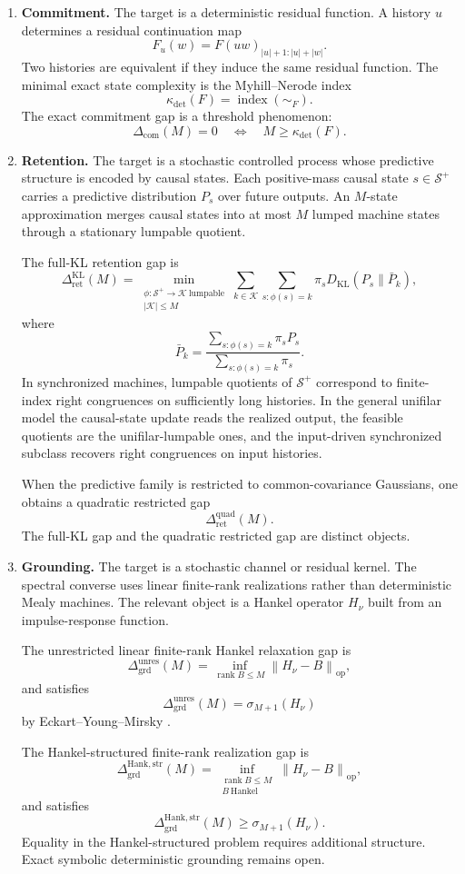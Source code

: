 \documentclass[12pt]{article}
\theoremstyle{definition}
\newcommand{\norm}[1]{\left\lVert#1\right\rVert}
\newcommand{\RetKL}{\Delta_{\mathrm{ret}}^{\mathrm{KL}}}
\newcommand{\RetQuad}{\Delta_{\mathrm{ret}}^{\mathrm{quad}}}
\newcommand{\Dunres}{\Delta_{\mathrm{grd}}^{\mathrm{unres}}}
\newcommand{\DHankstr}{\Delta_{\mathrm{grd}}^{\mathrm{Hank,str}}}
\newcommand{\Com}{\Delta_{\mathrm{com}}}
\newcommand{\Splus}{\mathcal S^{+}}
\begin{document}
\begin{enumerate}[label=(\arabic*),leftmargin=2.2em]
\item \textbf{Commitment.}
The target is a deterministic residual function.  A history $u$ determines a
residual continuation map
\[
F_u(w)=F(uw)_{|u|+1:|u|+|w|}.
\]
Two histories are equivalent if they induce the same residual function.  The
minimal exact state complexity is the Myhill--Nerode index
\[
\kappa_{\det}(F)
=
\operatorname{index}(\sim_F).
\]
The exact commitment gap is a threshold phenomenon:
\[
\Com(M)=0
\quad\Longleftrightarrow\quad
M\ge\kappa_{\det}(F).
\]

\item \textbf{Retention.}
The target is a stochastic controlled process whose predictive structure is
encoded by causal states.  Each positive-mass causal state $s\in\Splus$
carries a predictive distribution $P_s$ over future outputs.  An $M$-state
approximation merges causal states into at most $M$ lumped machine states
through a stationary lumpable quotient.

The full-KL retention gap is
\[
\RetKL(M)
=
\min_{\substack{
\phi:\Splus\to\mathcal K\ \text{lumpable}\\
|\mathcal K|\le M
}}
\sum_{k\in\mathcal K}
\sum_{s:\phi(s)=k}
\pi_s
D_{\mathrm{KL}}(P_s\|\bar P_k),
\]
where
\[
\bar P_k
=
\frac{
\sum_{s:\phi(s)=k}\pi_s P_s
}{
\sum_{s:\phi(s)=k}\pi_s
}.
\]
In synchronized machines, lumpable quotients of $\Splus$ correspond to
finite-index right congruences on sufficiently long histories.  In the general
unifilar model the causal-state update reads the realized output, the feasible
quotients are the unifilar-lumpable ones, and the input-driven synchronized
subclass recovers right congruences on input histories.

When the predictive family is restricted to common-covariance Gaussians, one
obtains a quadratic restricted gap
\[
\RetQuad(M).
\]
The full-KL gap and the quadratic restricted gap are distinct objects.

\item \textbf{Grounding.}
The target is a stochastic channel or residual kernel.  The spectral converse
uses linear finite-rank realizations rather than deterministic Mealy
machines.  The relevant object is a Hankel operator $H_\nu$ built from an
impulse-response function.

The unrestricted linear finite-rank Hankel relaxation gap is
\[
\Dunres(M)
=
\inf_{\operatorname{rank}B\le M}
\norm{H_\nu-B}_{\mathrm{op}},
\]
and satisfies
\[
\Dunres(M)
=
\sigma_{M+1}(H_\nu)
\]
by Eckart--Young--Mirsky \cite{eckart1936,mirsky1960}.

The Hankel-structured finite-rank realization gap is
\[
\DHankstr(M)
=
\inf_{\substack{
\operatorname{rank}B\le M\\
B\ \text{Hankel}
}}
\norm{H_\nu-B}_{\mathrm{op}},
\]
and satisfies
\[
\DHankstr(M)
\ge
\sigma_{M+1}(H_\nu).
\]
Equality in the Hankel-structured problem requires additional structure.
Exact symbolic deterministic grounding remains open.
\end{enumerate}
\end{document}
